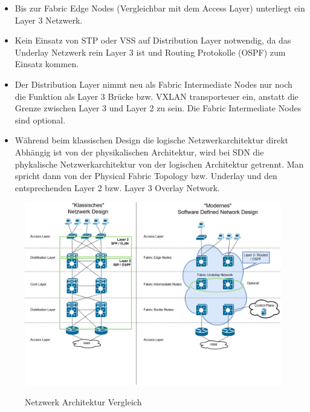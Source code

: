 \begin{itemize}
	\item Bis zur Fabric Edge Nodes (Vergleichbar mit dem Access Layer) unterliegt ein Layer 3 Netzwerk. 
	\item Kein Einsatz von STP oder VSS auf Distribution Layer notwendig, da das Underlay Netzwerk rein Layer 3 ist und Routing Protokolle (OSPF) zum Einsatz kommen.
	\item Der Distribution Layer nimmt neu als Fabric Intermediate Nodes nur noch die Funktion als Layer 3 Brücke bzw. VXLAN transporteuer ein, anstatt die Grenze zwischen Layer 3 und Layer 2 zu sein. Die Fabric Intermediate Nodes sind optional. 
	\item Während beim klassischen Design die logische Netzwerkarchitektur direkt Abhängig ist von der physikalischen Architektur, wird bei SDN die phykalische Netzwerkarchitektur von der logischen Architektur getrennt. Man spricht dann von der Physical Fabric Topology bzw. Underlay und den entsprechenden Layer 2 bzw. Layer 3 Overlay Network. 
\end{itemize}

\begin{figure}[H]
	\centering
	\includegraphics[width=1\linewidth]{img/LabNetworkArchitecture_Vergleich.png}\\[1px]
	\caption{Netzwerk Architektur Vergleich \cite{sda-designguide}}
	\label{fig:LabNetworkArchitectureVergleich}
\end{figure}


